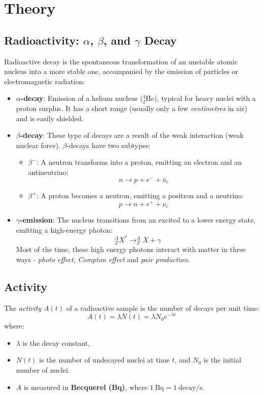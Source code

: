 \documentclass[12pt,a4paper]{article}
\begin{document}
\section{Theory}

\subsection{Radioactivity: $\alpha$, $\beta$, and $\gamma$ Decay}

Radioactive decay is the spontaneous transformation of an unstable atomic nucleus into a more stable one, accompanied by the emission of particles or electromagnetic radiation:

\begin{itemize}
  \item \textbf{$\alpha$-decay}: Emission of a helium nucleus ($^4_2\mathrm{He}$), typical for heavy nuclei with a proton surplus. It has a short range (usually only a few \textit{centimetres} in air) and is easily shielded.
  \item \textbf{$\beta$-decay}: These type of decays are a result of the weak interaction (weak nuclear force). $\beta$-decays have two subtypes:
    \begin{itemize}
      \item \textbf{$\beta^-$}: A neutron transforms into a proton, emitting an electron and an antineutrino: 
      \[
      n \rightarrow p + e^- + \bar{\nu}_e
      \]
      \item \textbf{$\beta^+$}: A proton becomes a neutron, emitting a positron and a neutrino:
      \[
      p \rightarrow n + e^+ + \nu_e
      \]
    \end{itemize}
  \item \textbf{$\gamma$-emission}: The nucleus transitions from an excited to a lower energy state, emitting a high-energy photon:
  \[
  ^A_ZX^* \rightarrow ^A_ZX + \gamma
  \]
  Most of the time, these high energy photons interact with matter in three ways - \textit{photo effect}, \textit{Compton effect} and \textit{pair production}.
\end{itemize}

\subsection{Activity}

The \textit{activity} $A(t)$ of a radioactive sample is the number of decays per unit time:
\[
A(t) = \lambda N(t) = \lambda N_0 e^{-\lambda t}
\]
where:
\begin{itemize}
  \item $\lambda$ is the decay constant,
  \item $N(t)$ is the number of undecayed nuclei at time $t$, and $N_0$ is the initial number of nuclei.
  \item $A$ is measured in \textbf{Becquerel (Bq)}, where $1~\mathrm{Bq} = 1~\mathrm{decay/s}$.
\end{itemize}
\end{document}
